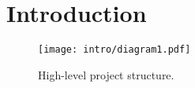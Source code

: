 \documentclass[../../main.tex]{subfiles}
\begin{document}
\chapter{Introduction}





\begin{figure}[ht]
  \centering
  \texttt{[image: intro/diagram1.pdf]}
  \caption{High-level project structure.}
  \label{fig:intro-diagram}
\end{figure}
\end{document}
